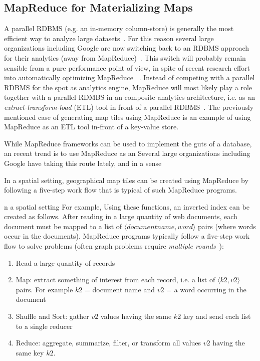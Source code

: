 \documentclass[11pt, oneside]{report}   	%
\begin{document}
\subsection{MapReduce for Materializing Maps}

A parallel RDBMS (e.g. an in-memory column-store) is generally the most efficient way to analyze large datasets~\cite{pavlo2009comparison}. For this reason several large organizations including Google are now switching back to an RDBMS approach for their analytics (away from MapReduce)~\cite{melnik2011dremel}. This switch will probably remain sensible from a pure performance point of view, in spite of recent research effort into automatically optimizing MapReduce ~\cite{jahani2011mapreduceoptimization,floratou2011columnmapreduce}. Instead of competing with a parallel RDBMS for the spot as analytics engine, MapReduce will most likely play a role together with a parallel RDMBS in an composite analytics architecture, i.e. as an \emph{extract-transform-load} (ETL) tool in front of a parallel RDBMS~\cite{stonebraker2010friendsorfoes}. The previously mentioned case of generating map tiles using MapReduce is an example of using MapReduce as an ETL tool in-front of a key-value store.


While MapReduce frameworks can be used to implement the guts of a database, an recent trend is to use MapReduce as an  Several large organizations including Google have taking this route lately, and in a sense 


In a spatial setting, geographical map tiles can be created using MapReduce by following a five-step work flow that is typical of such MapReduce programs. 

n a spatial setting For example, Using these functions, an inverted index can be created as follows. After reading in a large quantity of web documents, each document must be mapped to a list of $\langle document name, word \rangle$ pairs (where words occur in the documents). 
MapReduce programs typically follow a five-step work flow to solve problems (often graph problems require \emph{multiple rounds}~\cite{ekanayake2010itermapreduce,myung2010sparqlmapreduce}):

\begin{enumerate}
\item Read a large quantity of records
\item Map: extract something of interest from each record, i.e. a list of $\langle k2, v2 \rangle$ pairs. For example $k2$ = document name and $v2$ = a word occurring in the document
\item Shuffle and Sort: gather $v2$ values having the same $k2$ key and send each list to a single reducer 
\item Reduce: aggregate, summarize, filter, or transform all values $v2$ having the same key $k2$.
\end{enumerate}
\end{document}
